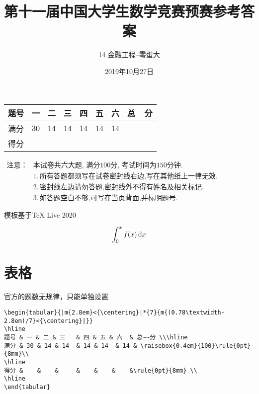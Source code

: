\documentclass[11pt,twoside]{article}
\title{第十一届中国大学生数学竞赛预赛参考答案}
\author{14 金融工程--零蛋大}
\date{2019年10月27日}
\begin{document}
\maketitle
\begin{flushleft}
\begin{tabular}{|m{2.8em}<{\centering}|*{7}{m{}<{\centering}|}}
\hline
题号 & 一 & 二 & 三   & 四 & 五 & 六  & 总~~分 \\\hline
满分 & 30 & 14 & 14  & 14 & 14  & 14 & \raisebox{0.4em}{100}\rule{0pt}{8mm}\\
\hline
得分 &    &    &     &    &    &    &\rule{0pt}{8mm} \\
\hline		
\end{tabular}\vspace*{0.6em}		
$\begin{aligned}
\mbox{注意：}
&\text{本试卷共六大题, 满分100分, 考试时间为150分钟.}\\
&1.\,\mbox{所有答题都须写在试卷密封线右边,写在其他纸上一律无效}.\\
&2.\,\mbox{密封线左边请勿答题,密封线外不得有姓名及相关标记}.\\
&3.\,\mbox{如答题空白不够,可写在当页背面,并标明题号}.
\end{aligned}$		
\end{flushleft}
\setlength{\marginparsep}{-0.8cm}

模板基于TeX Live 2020

\[\int_0^x f(x) \mathop{}\!\mathrm{d} x\]

\section{表格}
官方的题数无规律，只能单独设置
\begin{lstlisting}[style=tsdtex]
\begin{tabular}{|m{2.8em}<{\centering}|*{7}{m{(0.78\textwidth-2.8em)/7}<{\centering}|}}
\hline
题号 & 一 & 二 & 三   & 四 & 五 & 六  & 总~~分 \\\hline
满分 & 30 & 14 & 14  & 14 & 14  & 14 & \raisebox{0.4em}{100}\rule{0pt}{8mm}\\
\hline
得分 &    &    &     &    &    &    &\rule{0pt}{8mm} \\
\hline		
\end{tabular}
\end{lstlisting}
\end{document}
